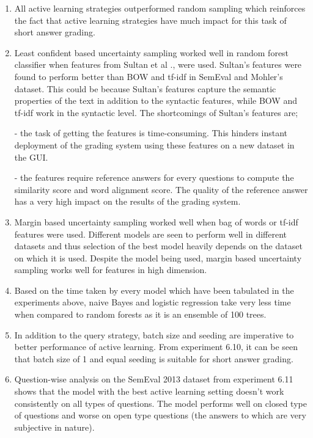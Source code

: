 \begin{enumerate}
	
	\item All active learning strategies outperformed random sampling which reinforces the fact that active learning strategies have much impact for this task of short answer grading.
	
	\item Least confident based uncertainty sampling worked well in random forest classifier when features from Sultan et al \cite{Sultan2016}., were used. Sultan's features were found to perform better than BOW and tf-idf in SemEval and Mohler's dataset. This could be because Sultan's features capture the semantic properties of the text in addition to the syntactic features, while BOW and tf-idf work in the syntactic level. The shortcomings of Sultan's features are;
	
	- the task of getting the features is time-consuming. This hinders instant deployment of the grading system using these features on a new dataset in the GUI. 
	
	- the features require reference answers for every questions to compute the similarity score and word alignment score. The quality of the reference answer has a very high impact on the results of the grading system.
	
	\item Margin based uncertainty sampling worked well when bag of words or tf-idf features were used. Different models are seen to perform well in different datasets and thus selection of the best model heavily depends on the dataset on which it is used. Despite the model being used, margin based uncertainty sampling works well for features in high dimension.
	
	\item Based on the time taken by every model which have been tabulated in the experiments above, naive Bayes and logistic regression take very less time when compared to random forests as it is an ensemble of 100 trees.
	
	\item In addition to the query strategy, batch size and seeding are imperative to better performance of active learning. From experiment 6.10, it can be seen that batch size of 1 and equal seeding is suitable for short answer grading.
	
	\item Question-wise analysis on the SemEval 2013 dataset from experiment 6.11 shows that the model with the best active learning setting doesn't work consistently on all types of questions. The model performs well on closed type of questions and worse on open type questions (the answers to which are very subjective in nature).
	

\end{enumerate}
